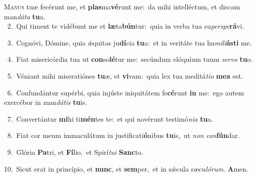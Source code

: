 \lettrine{\initial\textcolor{\initialcolor}{M}}{anus} tuæ fecérunt me, et \textbf{plas}\-ma\-\textbf{vé}\-runt me:~\star da mihi intelléctum, et discam man\-\textit{dá}\-\textit{ta} \textbf{tu}\-a.\\
{\numbfont\textcolor{\numbcolor}{~2.}}~Qui timent te vidébunt me et \textbf{læ}\-ta\-\textbf{bún}\-tur:~\star quia in verba tua su\-\textit{per}\-\textit{spe}\textbf{rá}vi.\par
{\numbfont\textcolor{\numbcolor}{~3.}}~Cognóvi, Dómine, quia ǽquitas ju\-\textbf{dí}\-cia \textbf{tu}\-a:~\star et in veritáte tua hu\-\textit{mi}\-\textit{li}\textbf{ás}\textbf{ti} me.\par
{\numbfont\textcolor{\numbcolor}{~4.}}~Fiat misericórdia tua ut \textbf{con}\-so\-\textbf{lé}\-tur me:~\star secúndum elóquium tuum \textit{ser}\-\textit{vo} \textbf{tu}\-o.\par
{\numbfont\textcolor{\numbcolor}{~5.}}~Véniant mihi miseratiónes \textbf{tu}\-æ, et \textbf{vi}\-vam:~\star quia lex tua meditá\-\textit{ti}\-\textit{o} \textbf{me}\-\textbf{a} est.\par
{\numbfont\textcolor{\numbcolor}{~6.}}~Confundántur supérbi, quia injúste iniquitátem fe\-\textbf{cé}\-runt \textbf{in} me:~\star ego autem exercébor in man\-\textit{dá}\-\textit{tis} \textbf{tu}\-is.\par
{\numbfont\textcolor{\numbcolor}{~7.}}~Convertántur \textbf{mi}\-hi ti\-\textbf{mén}\-tes te:~\star et qui novérunt testimó\-\textit{ni}\-\textit{a} \textbf{tu}\-a.\par
{\numbfont\textcolor{\numbcolor}{~8.}}~Fiat cor meum immaculátum in justificati\-\textbf{ó}\-nibus \textbf{tu}\-is,~\star ut \textit{non} \textit{con}\-\textbf{fún}dar.\par
{\numbfont\textcolor{\numbcolor}{~9.}}~Glória \textbf{Pa}\-tri, et \textbf{Fí}\-lio,~\star et Spirí\-\textit{tu}\-\textit{i} \textbf{Sanc}\-to.\par
{\numbfont\textcolor{\numbcolor}{10.}}~Sicut erat in princípio, et \textbf{nunc}\-, et \textbf{sem}\-per,~\star et in sǽcula sæcu\-\textit{ló}\-\textit{rum}. \textbf{A}\-men.\par
